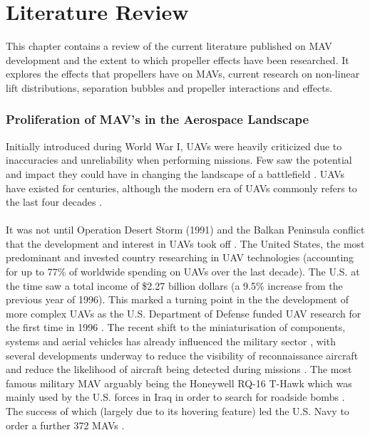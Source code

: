 \graphicspath{{./Figs/}}


\chapter{Literature Review}
This chapter contains a review of the current literature published on MAV development and the extent to which propeller effects have been researched. It explores the effects that propellers have on MAVs, current research on non-linear lift distributions, separation bubbles and propeller interactions and effects.

\subsection{Proliferation of MAV's in the Aerospace Landscape}
\label{subsec:ProliferationMAVs}
Initially introduced during World War I, UAVs were heavily criticized due to inaccuracies and unreliability when performing missions. Few saw the potential and impact they could have in changing the landscape of a battlefield \cite{thebook}. UAVs have existed for centuries, although the modern era of UAVs commonly refers to the last four decades \cite{Cook2007}. \\
\\
It was not until Operation Desert Storm (1991) and the Balkan Peninsula conflict that the development and interest in UAVs took off \cite{thebook} \cite{MacConnell2007}. The United States, the most predominant and invested country researching in UAV technologies (accounting for up to 77\% of worldwide spending on UAVs \cite{thebook} over the last decade). The U.S. at the time saw a total income of \$2.27 billion dollars \cite{thebook} (a 9.5\% increase from the previous year of 1996). This marked a turning point in the the development of more complex UAVs \cite{tac2022} as the U.S. Department of Defense funded UAV research for the first time in 1996 \cite{keennon2003}. The recent shift to the miniaturisation of components, systems and aerial vehicles has already influenced the military sector \cite{Aleksander2018} \cite{Mil2022}, with several developments underway to reduce the visibility of reconnaissance aircraft and reduce the likelihood of aircraft being detected during missions \cite{Greenwood2019} \cite{Saytov2022}.  The most famous military MAV arguably being the Honeywell RQ-16 T-Hawk \cite{Agbeyangi2016}  which was mainly used by the U.S. forces in Iraq in order to search for roadside bombs \cite{Crivoi2022}. The success of which (largely due to its hovering feature) led the U.S. Navy to order a further 372 MAVs \cite{design2022}.\\

